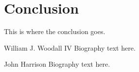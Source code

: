 \documentclass[journal]{IEEEtran}
\begin{document}
  \section{Conclusion}
  This is where the conclusion goes.
  
  
  
  
  \begin{IEEEbiography}{William J. Woodall IV}
  Biography text here.
  \end{IEEEbiography}
  
  \begin{IEEEbiography}{John Harrison}
  Biography text here.
  \end{IEEEbiography}
  
\end{document}
